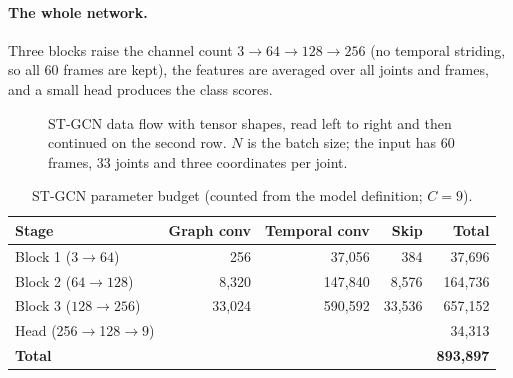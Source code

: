 \documentclass[11pt,a4paper]{article}
\begin{document}
\paragraph{The whole network.} Three blocks raise the channel count $3\to64\to128\to256$ (no temporal striding, so all 60 frames are kept), the features are averaged over all joints and frames, and a small head produces the class scores.

\begin{figure}[ht]
\centering
{}
\caption{ST-GCN data flow with tensor shapes, read left to right and then continued on the second row. $N$ is the batch size; the input has 60 frames, 33 joints and three coordinates per joint.}
\end{figure}

\begin{table}[ht]
\centering\small
\caption{ST-GCN parameter budget (counted from the model definition; $C=9$).}\label{tab:stgcnparams}
\begin{tabular}{@{}lrrrr@{}}
\toprule
Stage & Graph conv & Temporal conv & Skip & Total \\ \midrule
Block 1 ($3\to64$) & 256 & 37,056 & 384 & 37,696 \\
Block 2 ($64\to128$) & 8,320 & 147,840 & 8,576 & 164,736 \\
Block 3 ($128\to256$) & 33,024 & 590,592 & 33,536 & 657,152 \\
Head (256$\to$128$\to9$) & \multicolumn{3}{c}{} & 34,313 \\ \midrule
\textbf{Total} & \multicolumn{3}{c}{} & \textbf{893,897} \\ \bottomrule
\end{tabular}
\end{table}
\end{document}
